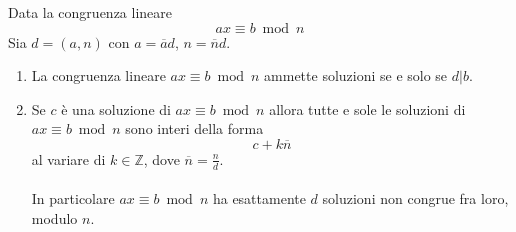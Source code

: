 \documentclass[a4paper,12pt, oneside]{book}
\begin{document}
		\begin{teorema}
			Data la congruenza lineare $$ax \equiv b \bmod n$$
			Sia $d = (a,n)$ con $a = \overline{a}d$, $n = \overline{n}d$.
			\begin{enumerate}
				\item La congruenza lineare $ax \equiv b \bmod n$ ammette soluzioni se e solo se $d|b$.
				\item Se $c$ è una soluzione di $ax \equiv b \bmod n$ allora tutte e sole le soluzioni di $ax \equiv b \bmod n$ sono interi della forma $$c + k\overline{n}$$ al variare di $k \in \mathbb{Z}$, dove $\overline{n} = \frac{n}{d}$.\\\\
				In particolare $ax \equiv b \bmod n$ ha esattamente $d$ soluzioni non congrue fra loro, modulo $n$.
			\end{enumerate}


\end{teorema}
\end{document}
